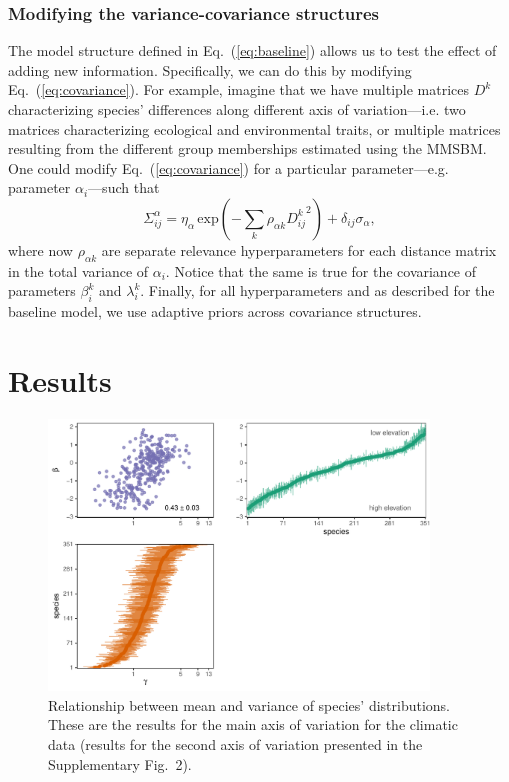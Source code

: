 \documentclass[11pt, a4paper]{article}
\begin{document}
\subsubsection*{Modifying the variance-covariance structures}
The model structure defined in Eq.~(\ref{eq:baseline}) allows us to test the effect of adding new information. Specifically, we can do this by modifying Eq.~(\ref{eq:covariance}). For example, imagine that we have multiple matrices $D^k$ characterizing species' differences along different axis of variation---i.e. two matrices characterizing ecological and environmental traits, or multiple matrices resulting from the different group memberships estimated using the MMSBM. One could modify Eq.~(\ref{eq:covariance}) for a particular parameter---e.g. parameter $\alpha_i$---such that
\begin{equation} 
\Sigma^{\alpha}_{ij} = \eta_{\alpha}\,\text{exp}\left(-\sum_k\rho_{\alpha k} {D^{k}_{ij}}^2\right) + \delta_{ij} \sigma_{\alpha} ,
\label{eq:covariance-complex}
\end{equation}
where now $\rho_{\alpha k}$ are separate relevance hyperparameters for each distance matrix in the total variance of $\alpha_i$. Notice that the same is true for the covariance of parameters $\beta_i^k$ and $\lambda_i^k$. Finally, for all hyperparameters and as described for the baseline model, we use adaptive priors across covariance structures.

\section*{Results}
\begin{figure}[ht]
  \centering
    \vspace{0.5cm}
    \includegraphics[width=0.9\textwidth]{figures/figure1}
    	  \vspace{0.3cm}
	   \caption{Relationship between mean and variance of species' distributions. These are the results for the main axis of variation for the climatic data (results for the second axis of variation presented in the Supplementary Fig.~2).}
      \label{fig:correlation}
\end{figure}
\end{document}
